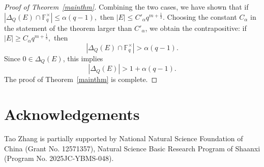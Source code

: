 \documentclass[11pt]{article}
\newcommand{\F}{\mathbb{F}}
\newcommand{\1}{\mathbf{1}}
\begin{document}
\begin{proof}[Proof of Theorem~\ref{mainthm}]
	Combining the two cases, we have shown that if $|\Delta_Q(E)\cap\F_q^\times|\le \alpha(q-1),$
	then $|E|\le C'_\alpha q^{m+\frac13}.$
	Choosing the constant \(C_\alpha\) in the statement of the theorem larger
	than \(C'_\alpha\), we obtain the contrapositive: if $|E|\ge C_\alpha q^{m+\frac13},$
	then
	\[
	|\Delta_Q(E)\cap\F_q^\times|>\alpha(q-1).
	\]
	Since \(0\in\Delta_Q(E)\), this implies
	\[
	|\Delta_Q(E)|>1+\alpha(q-1).
	\]
	The proof of Theorem~\ref{mainthm} is complete.
\end{proof}


\section*{Acknowledgements}
Tao Zhang is partially supported by National Natural Science Foundation of China (Grant No. 12571357),
Natural Science Basic Research Program of Shaanxi  (Program No. 2025JC-YBMS-048).
\end{document}
